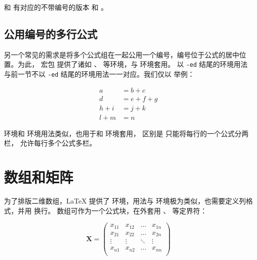  和  有对应的不带编号的版本  和 。

\subsection{公用编号的多行公式}\label{subsec:aligned}

另一个常见的需求是将多个公式组在一起公用一个编号，编号位于公式的居中位置。为此， 宏包
提供了诸如 、 等环境，与  环境套用。
以 \texttt{-ed} 结尾的环境用法与前一节不以 \texttt{-ed} 结尾的环境用法一一对应。我们仅以  举例：
\begin{example}
\begin{equation}
\begin{aligned}
a &= b + c \\
d &= e + f + g \\
h + i &= j + k \\
l + m &= n
\end{aligned}
\end{equation}
\end{example}

 环境和  环境用法类似，也用于和  环境套用，
区别是  只能将每行的一个公式分两栏， 允许每行多个公式多栏。


\section{数组和矩阵}\label{sec:arrays}

为了排版二维数组，\LaTeX{} 提供了  环境，用法与  环境极为类似，也需要定义列格式，并用 \crcmd{} 换行。
数组可作为一个公式块，在外套用 、 等定界符：
\begin{example}
\[ \mathbf{X} = \left(
\begin{array}{cccc}
x_{11} & x_{12} & \ldots & x_{1n}\\
x_{21} & x_{22} & \ldots & x_{2n}\\
\vdots & \vdots & \ddots & \vdots\\
x_{n1} & x_{n2} & \ldots & x_{nn}\\
\end{array} \right) \]
\end{example}

